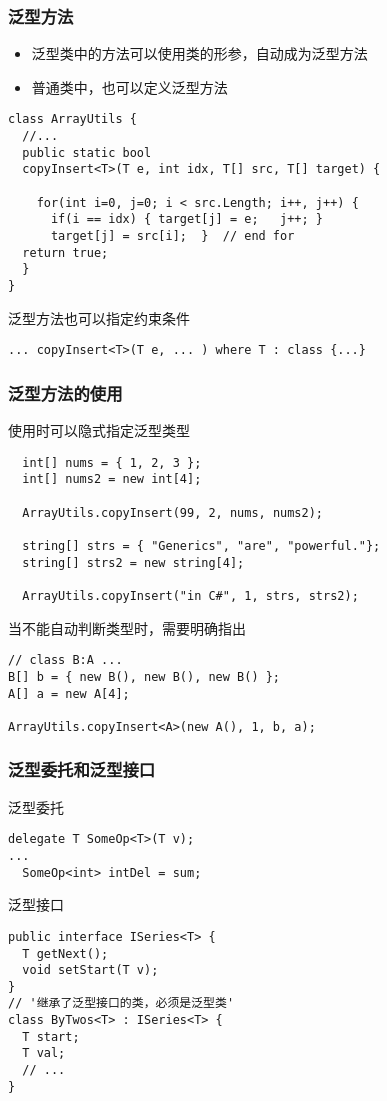 \begin{frame}[fragile]
\frametitle{泛型方法}
\begin{itemize}
\item 泛型类中的方法可以使用类的形参，自动成为泛型方法
\item 普通类中，也可以定义泛型方法
\end{itemize}
\begin{lstlisting}
class ArrayUtils {
  //...
  public static bool
  copyInsert<T>(T e, int idx, T[] src, T[] target) {

    for(int i=0, j=0; i < src.Length; i++, j++) {
      if(i == idx) { target[j] = e;   j++; }
      target[j] = src[i];  }  // end for
  return true;
  }
}
\end{lstlisting}
泛型方法也可以指定约束条件
\begin{lstlisting}
... copyInsert<T>(T e, ... ) where T : class {...}
\end{lstlisting}
\end{frame}

\begin{frame}[fragile]
\frametitle{泛型方法的使用}
使用时可以隐式指定泛型类型
\begin{lstlisting}
  int[] nums = { 1, 2, 3 };
  int[] nums2 = new int[4];

  ArrayUtils.copyInsert(99, 2, nums, nums2);

  string[] strs = { "Generics", "are", "powerful."};
  string[] strs2 = new string[4];

  ArrayUtils.copyInsert("in C#", 1, strs, strs2);
\end{lstlisting}
当不能自动判断类型时，需要明确指出
\begin{lstlisting}
// class B:A ...
B[] b = { new B(), new B(), new B() };
A[] a = new A[4];

ArrayUtils.copyInsert<A>(new A(), 1, b, a);
\end{lstlisting}
\end{frame}

\begin{frame}[fragile]
\frametitle{泛型委托和泛型接口}
泛型委托
\begin{lstlisting}
delegate T SomeOp<T>(T v);
...
  SomeOp<int> intDel = sum;
\end{lstlisting}
泛型接口
\begin{lstlisting}[escapeinside='']
public interface ISeries<T> {
  T getNext();
  void setStart(T v);
}
// '继承了泛型接口的类，必须是泛型类'
class ByTwos<T> : ISeries<T> {
  T start;
  T val;
  // ...
}
\end{lstlisting}
\end{frame}


